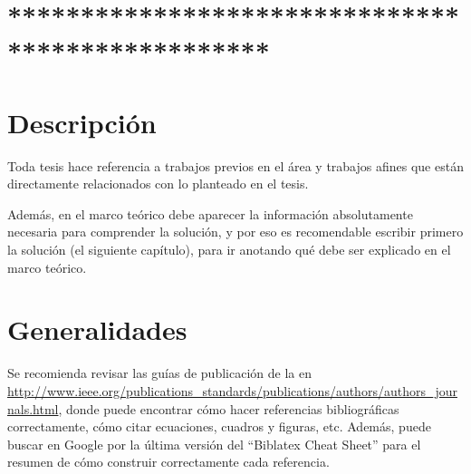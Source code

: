 \section{*************************************************}








\section{Descripción}

Toda tesis hace referencia a trabajos previos en el área y trabajos afines que
están directamente relacionados con lo planteado en el tesis.

Además, en el marco teórico debe aparecer la información absolutamente
necesaria para comprender la solución, y por eso es recomendable escribir
primero la solución (el siguiente capítulo), para ir anotando qué debe ser
explicado en el marco teórico.

\section{Generalidades}

Se recomienda revisar las guías de publicación de la  en
\url{http://www.ieee.org/publications_standards/publications/authors/authors_journals.html},
donde puede encontrar cómo hacer referencias bibliográficas
correctamente, cómo citar ecuaciones, cuadros y figuras, etc.  Además,
puede buscar en Google por la última versión del ``Biblatex Cheat
Sheet'' para el resumen de cómo construir correctamente cada
referencia.

